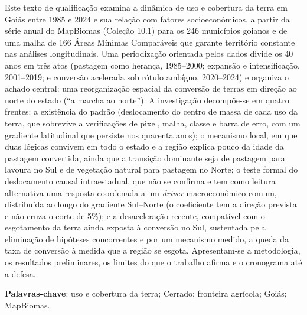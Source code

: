 \setlength{\absparsep}{18pt}
\begin{resumo}
Este texto de qualificação examina a dinâmica de uso e cobertura da terra em
Goiás entre 1985 e 2024 e sua relação com fatores socioeconômicos, a partir da
série anual do MapBiomas (Coleção 10.1) para os 246 municípios goianos e de uma
malha de 166 Áreas Mínimas Comparáveis que garante território constante nas
análises longitudinais. Uma periodização orientada pelos dados divide os 40
anos em três atos (pastagem como herança, 1985--2000; expansão e
intensificação, 2001--2019; e conversão acelerada sob rótulo ambíguo,
2020--2024) e organiza o achado central: uma reorganização espacial da
conversão de terras em direção ao norte do estado (``a marcha ao norte''). A
investigação decompõe-se em quatro frentes: a existência do padrão
(deslocamento do centro de massa de cada uso da terra, que sobrevive a
verificações de pixel, malha, classe e barra de erro, com um gradiente
latitudinal que persiste nos quarenta anos); o mecanismo local, em que duas
lógicas convivem em todo o estado e a região explica pouco da idade da pastagem
convertida, ainda que a transição dominante seja de pastagem para lavoura no
Sul e de vegetação natural para pastagem no Norte; o teste formal do
deslocamento causal intraestadual, que não se confirma e tem como leitura
alternativa uma resposta coordenada a um \emph{driver} macroeconômico comum,
distribuída ao longo do gradiente Sul--Norte (o coeficiente tem a direção
prevista e não cruza o corte de 5\%); e a desaceleração recente, compatível com o esgotamento da terra
ainda exposta à conversão no Sul, sustentada pela eliminação de hipóteses
concorrentes e por um mecanismo medido, a queda da taxa de conversão à medida
que a região se esgota. Apresentam-se a metodologia, os resultados
preliminares, os limites do que o trabalho afirma e o cronograma até a defesa.

\textbf{Palavras-chave}: uso e cobertura da terra; Cerrado; fronteira
agrícola; Goiás; MapBiomas.
\end{resumo}
